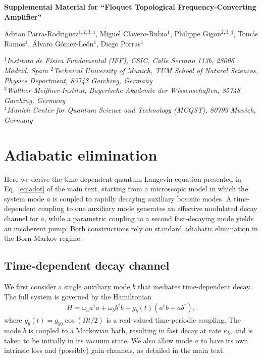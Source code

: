 \documentclass[prl,twocolumn,floatfix,10pt,superscriptaddress]{revtex4-2}
\begin{document}
\begin{center}
	{\large\bf Supplemental Material for ``Floquet Topological Frequency-Converting Amplifier''}
	
	\vspace{0.5cm}

	{
Adrian Parra-Rodriguez$^{1,2,3,4}$, 
Miguel Clavero-Rubio$^{1}$, 
Philippe Gigon$^{2,3,4}$, 
Tom\'as Ramos$^{1}$, 
Álvaro Gómez-León$^{1}$, 
Diego Porras$^{1}$
}

\vspace{0.3cm}

{\it
$^{1}$Instituto de F\'isica Fundamental (IFF), CSIC, Calle Serrano 113b, 28006 Madrid, Spain
$^{2}$Technical University of Munich, TUM School of Natural Sciences, Physics Department, 85748 Garching, Germany\\
$^{3}$Walther-Mei{\ss}ner-Institut, Bayerische Akademie der Wissenschaften, 85748 Garching, Germany\\
$^{4}$Munich Center for Quantum Science and Technology (MCQST), 80799 Munich, Germany
}

\end{center}

\section{Adiabatic elimination}
Here we derive the time-dependent quantum Langevin equation presented in Eq.~\eqref{eq:adot} of the main text, starting from a microscopic model in which the system mode $a$ is coupled to rapidly decaying auxiliary bosonic modes. A time-dependent coupling to one auxiliary mode generates an effective modulated decay channel for $a$, while a parametric coupling to a second fast-decaying mode yields an incoherent pump. Both constructions rely on standard adiabatic elimination in the Born-Markov regime.

\subsection{Time-dependent decay channel}

We first consider a single auxiliary mode $b$ that mediates time-dependent decay. The full system is governed by the Hamiltonian
\begin{align}
H = \omega_a a^\dagger a + \omega_b b^\dagger b +  g_b(t) (a^\dagger b + a b^\dagger),
\end{align}
where $g_b(t) = g_{b0} \cos(\Omega t/2)$ is a real-valued time-periodic coupling. The mode $b$ is coupled to a Markovian bath, resulting in fast decay at rate $\kappa_b$, and is taken to be initially in its vacuum state. We also allow mode $a$ to have its own intrinsic loss and (possibly) gain channels, as detailed in the main text.
\end{document}
